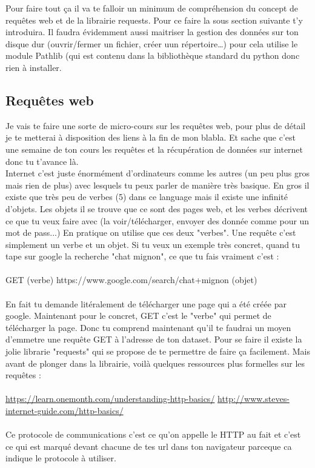 \documentclass[10pt,a4paper]{book}
\begin{document}
Pour faire tout ça il va te falloir un minimum de compréhension du concept de requêtes web et de la librairie requests.
Pour ce faire la sous section suivante t'y introduira.
Il faudra évidemment aussi maitriser la gestion des données sur ton disque dur (ouvrir/fermer un fichier, créer uun répertoire\ldots) pour cela utilise le module Pathlib (qui est contenu dans la bibliothèque standard du python donc rien à installer. 

\subsection{Requêtes web}
Je vais te faire une sorte de micro-cours sur les requêtes web, pour plus de détail je te metterai à disposition des liens à la fin de mon blabla. Et sache que c'est une semaine de ton cours les requêtes et la récupération de données sur internet donc tu t'avance là. 
\\
Internet c'est juste énormément d'ordinateurs comme les autres (un peu plus gros mais rien de plus) avec lesquels tu peux parler de manière très basique. En gros il existe que très peu de verbes (5) dans ce language mais il existe une infinité d'objets. Les objets il se trouve que ce sont des pages web, et les verbes décrivent ce que tu veux faire avec (la voir/télécharger, envoyer des donnée comme pour un mot de pass...) En pratique on utilise que ces deux "verbes". Une requête c'est simplement un verbe et un objet. Si tu veux un exemple très concret, quand tu tape sur google la recherche "chat mignon", ce que tu fais vraiment c'est :
\\\\
GET (verbe) https://www.google.com/search/chat+mignon (objet) 
\\\\
En fait tu demande litéralement de télécharger une page qui a été créée par google. 
Maintenant pour le concret, GET c'est le "verbe" qui permet de télécharger la page. Donc tu comprend maintenant qu'il te faudrai un moyen d'emmetre une requête GET à l'adresse de ton dataset. Pour se faire il existe la jolie librarie "requests" qui se propose de te permettre de faire ça facilement. Mais avant de plonger dans la librairie, voilà quelques ressources plus formelles sur les requêtes :
\\\\
\url{https://learn.onemonth.com/understanding-http-basics/}
\url{http://www.steves-internet-guide.com/http-basics/}
\\\\
Ce protocole de communications c'est ce qu'on appelle le HTTP au fait et c'est ce qui est marqué devant chacune de tes url dans ton navigateur parceque ca indique le protocole à utiliser.
\end{document}
